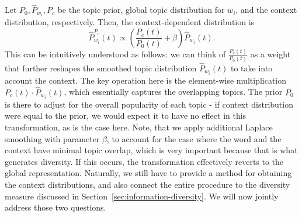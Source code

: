 \bed\label{context}
Let $P_0,\widehat{P}_{w_i}, P_c$ be the topic prior, global
topic distribution for $w_i$, and the context distribution,
respectively. Then, the context-dependent distribution is
\begin{equation*}
\widehat{P}^{P_c}_{w_i}(t)\propto \left(\frac{P_c(t)}{P_0(t)} + \beta\right)\widehat{P}_{w_i}(t).
\end{equation*}
\eed
This can be intuitively understood as follows:
we can think of $\frac{P_c(t)}{P_0(t)}$ as a weight
that further reshapes the smoothed topic distribution $\widehat{P}_{w_i}(t)$
to take into account the context. The key operation here is the
element-wise multiplication $P_c(t)\cdot\widehat{P}_{w_i}(t)$, which
essentially captures the overlapping topics. The prior $P_0$ is there
to adjust for the overall popularity of each topic - if context
distribution were equal to the prior, we would expect it to have no effect in
this transformation, as is the case here. Note, that we apply additional
Laplace smoothing with parameter $\beta$, to account for the case where
the word and the context have minimal topic overlap, which is very
important because that is what generates diversity. If this occurs,
the transformation effectively reverts to the global representation. Naturally, we still
have to provide a method for obtaining the context distributions, and
also connect the entire procedure to the diversity measure discussed in
Section~\ref{sec:information-diversity}. We will now jointly address
those two questions.



